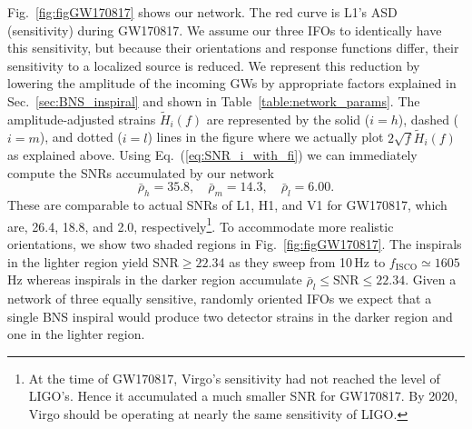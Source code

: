 \documentclass[11pt,a4paper]{article}
\newcommand{\be}{\begin{equation}}
\newcommand{\ee}{\end{equation}}
\begin{document}
Fig.~\ref{fig:figGW170817} shows our network. The red curve is L1's ASD (sensitivity) during GW170817. We assume our three IFOs to identically have this sensitivity,
but because their orientations and response functions differ, their sensitivity to a localized source is reduced. We represent this reduction by lowering the
amplitude of the incoming GWs by appropriate factors explained in Sec.~\ref{sec:BNS_inspiral} and shown in Table~\ref{table:network_params}.
The amplitude-adjusted strains $ \tilde{H}_i(f)$ are represented by the solid ($i=h$), dashed ($i=m$), and dotted ($i=l$) lines in the figure where we actually plot
$2\sqrt{f} \tilde{H}_i(f)$ as explained above.
Using Eq.~(\ref{eq:SNR_i_with_fi}) we can immediately compute the SNRs accumulated by our network
%
\be
\bar\rho_h = 35.8,\quad \bar\rho_m = 14.3,\quad \bar\rho_l = 6.00 \label{eq:GW170817_SNRs}.
\ee
%
These are comparable to actual SNRs of L1, H1, and V1 for GW170817, which are, 26.4, 18.8, and 2.0, respectively\footnote{At the time of GW170817, Virgo's sensitivity had not reached the level of LIGO's. Hence it accumulated a much smaller SNR for GW170817. By 2020, Virgo should be operating at nearly the same sensitivity of LIGO.}.
To accommodate more realistic orientations, we show two shaded regions in Fig.~\ref{fig:figGW170817}. The inspirals in the lighter region yield SNR$\ge 22.34$ as
they sweep from 10\,Hz to $f_\text{ISCO} \simeq1605\,$Hz whereas inspirals in the darker region accumulate $ \bar\rho_l \le \text{SNR} \le 22.34$.
Given a network of three equally sensitive, randomly oriented IFOs we expect that a single BNS inspiral would produce two detector strains in the darker region 
and one in the lighter region.
%
%
\end{document}
